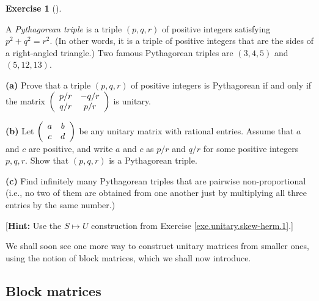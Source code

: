 \documentclass[numbers=enddot,12pt,final,onecolumn,notitlepage]{scrartcl}%
\newcounter{exer}
\numberwithin{exer}{subsection}
\theoremstyle{definition}
\newtheorem{exmp}[exer]{Exercise}
\newenvironment{exercise}[1][]
{\begin{exmp}[#1]\begin{leftbar}}
{\end{leftbar}\end{exmp}}
\begin{document}
\begin{exercise}
\label{exe.unitary.skew-herm.pyth} A \emph{Pythagorean triple} is a
triple $\left(  p,q,r\right)  $ of positive integers satisfying $p^{2}%
+q^{2}=r^{2}$. (In other words, it is a triple of positive integers that are
the sides of a right-angled triangle.) Two famous Pythagorean triples are
$\left(  3,4,5\right)  $ and $\left(  5,12,13\right)  $.

\textbf{(a)} Prove that a triple $\left(  p,q,r\right)  $ of positive integers
is Pythagorean if and only if the matrix $\left(
\begin{array}
[c]{cc}%
p/r & -q/r\\
q/r & p/r
\end{array}
\right)  $ is unitary.

\textbf{(b)} Let $\left(
\begin{array}
[c]{cc}%
a & b\\
c & d
\end{array}
\right)  $ be any unitary matrix with rational entries. Assume that $a$ and
$c$ are positive, and write $a$ and $c$ as $p/r$ and $q/r$ for some positive
integers $p,q,r$. Show that $\left(  p,q,r\right)  $ is a Pythagorean triple.

\textbf{(c)} Find infinitely many Pythagorean triples that are pairwise
non-proportional (i.e., no two of them are obtained from one another just by
multiplying all three entries by the same number.)

[\textbf{Hint:} Use the $S\mapsto U$ construction from Exercise
\ref{exe.unitary.skew-herm.1}.]
\end{exercise}

We shall soon see one more way to construct unitary matrices from smaller
ones, using the notion of block matrices, which we shall now introduce.

\subsection{Block matrices}
\end{document}
